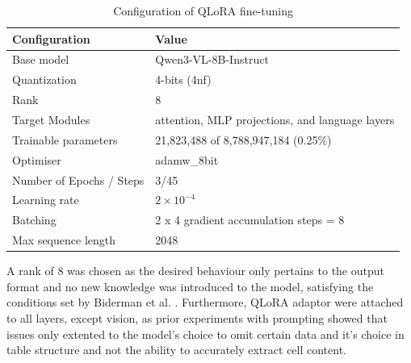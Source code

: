 \documentclass[ %
                    author={Natchalin Iwsakul \\[0.4em] Inkaphol Siriwongwattana \\[0.4em] Tanaphan Kummaraphat \\[0.6em] Patorn Srisupap},,
                supervisor={Fernando Moreno-Pino},
                    degree={MSc},
                     title={Propensity Modelling for SME Commercial Lending Using Open Public Data
},
                  subtitle={Companies House and GDELT as predictors of first-time borrowing},
                      type={},
                      year={2026}]{dissertation}
\begin{document}
  \begin{table}[H]
    \centering
    \begin{tabular}{ll}
    \toprule
    Configuration & Value \\
    \midrule
    Base model      & 	Qwen3-VL-8B-Instruct \\
    Quantization    &   4-bits (4nf)    \\
    Rank & 8    \\
    Target Modules & attention, MLP projections, and language layers \\
    Trainable parameters    &   21,823,488 of 8,788,947,184 (0.25\%) \\
    Optimiser	& adamw\_8bit  \\
    Number of Epochs / Steps    & 3/45 \\
    Learning rate	& $2 \times 10^{-4}$ \\
    Batching    &  2 x 4 gradient accumulation steps = 8 \\
    Max sequence length &   2048 \\
    \bottomrule
    \end{tabular}
    \caption[]{Configuration of QLoRA fine-tuning}
    \label{tab:windows}
    \end{table}
  
    A rank of 8 was chosen as the desired behaviour only pertains to the output format and no new knowledge was introduced to the model, satisfying the conditions set by Biderman et al. \cite{biderman2024lora}. Furthermore, QLoRA adaptor were attached to all layers, except vision, as prior experiments with prompting showed that issues only extented to the model's choice to omit certain data and it's choice in table structure and not the ability to accurately extract cell content. 

    
\end{document}
